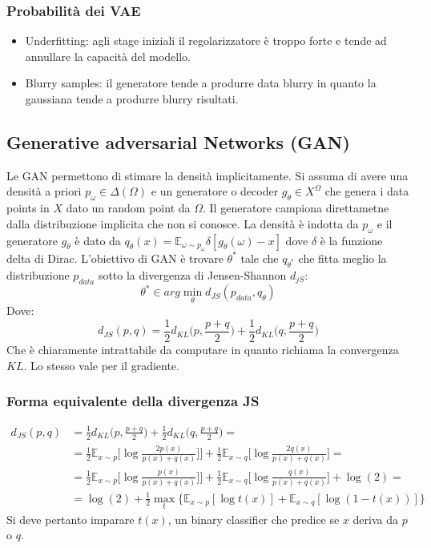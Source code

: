 		\subsubsection{Probabilit\`a dei VAE}
		\begin{itemize}
		\item Underfitting: agli stage iniziali il regolarizzatore \`e troppo forte e tende ad annullare la capacit\`a del modello.
		\item Blurry samples: il generatore tende a produrre data blurry in quanto la gaussiana tende a produrre blurry risultati.
	\end{itemize}

	\subsection{Generative adversarial Networks (GAN)}
	Le GAN permettono di stimare la densit\`a implicitamente.
	Si assuma di avere una densit\`a a priori $p_\omega\in\Delta(\Omega)$ e un generatore o decoder $g_\theta\in X^\Omega$ che genera i data points in $X$ dato un random point da $\Omega$.
	Il generatore campiona direttametne dalla distribuzione implicita che non si conosce.
	La densit\`a \`e indotta da $p_\omega$ e il generatore $g_\theta$ \`e dato da $q_\theta(x) = \mathbb{E}_{\omega\sim p_\omega}\delta[g_\theta(\omega) - x]$ dove $\delta$ \`e la funzione delta di Dirac.
	L'obiettivo di GAN \`e trovare $\theta^*$ tale che $q_{\theta^*}$ che fitta meglio la distribuzione $p_{data}$ sotto la divergenza di Jensen-Shannon $d_{jS}$:
	$$\theta^*\in arg\min\limits_{\theta} d_{JS}(p_{data},q_\theta)$$
	Dove:
	$$d_{JS}(p,q) = \frac{1}{2}d_{KL}\bigl(p,\frac{p+q}{2}\bigr)+\frac{1}{2}d_{KL}\bigl(q,\frac{p+q}{2}\bigr)$$
	Che \`e chiaramente intrattabile da computare in quanto richiama la convergenza $KL$.
	Lo stesso vale per il gradiente.

		\subsubsection{Forma equivalente della divergenza JS}
		\begin{align*}
			d_{JS}(p,q) &= \frac{1}{2}d_{KL}\bigl(p, \frac{p+q}{2}\bigr) + \frac{1}{2}d_{KL}\bigl(q, \frac{p+q}{2}\bigr)=\\
									&=\frac{1}{2}\mathbb{E}_{x\sim p}\bigl[\log\frac{2p(x)}{p(x)+q(x)}]\bigr]+\frac{1}{2}\mathbb{E}_{x\sim q}\bigl[\log\frac{2q(x)}{p(x)+q(x)}\bigr]=\\
									&=\frac{1}{2}\mathbb{E}_{x\sim p}\bigl[\log\frac{p(x)}{p(x)+q(x)}]\bigr]+\frac{1}{2}\mathbb{E}_{x\sim q}\bigl[\log\frac{q(x)}{p(x)+q(x)}\bigr] + \log(2)=\\
									&=\log(2)+\frac{1}{2}\max\limits_t\{\mathbb{E}_{x\sim p}[\log t(x)]+\mathbb{E}_{x\sim q}[\log(1-t(x))]\}
		\end{align*}
		Si deve pertanto imparare $t(x)$, un binary classifier che predice se $x$ deriva da $p$ o $q$.

